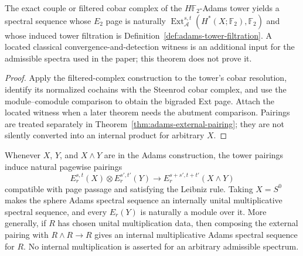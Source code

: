 \begin{theorem}
  \label{thm:adams-tower-ext-comparison}
  \notready
  The exact couple or filtered cobar complex of the
  $H\mathbb F_2$-Adams tower yields a spectral sequence whose $E_2$ page is
  naturally
  $\operatorname{Ext}_{\mathcal A}^{s,t}
  (H^*(X;\mathbb F_2),\mathbb F_2)$ and whose induced tower filtration is
  Definition~\ref{def:adams-tower-filtration}.  A located classical
  convergence-and-detection witness is an additional input for the admissible
  spectra used in the paper; this theorem does not prove it.
\end{theorem}

\begin{proof}
  Apply the filtered-complex construction to the tower's cobar resolution,
  identify its normalized cochains with the Steenrod cobar complex, and use
  the module--comodule comparison to obtain the bigraded Ext page.  Attach the
  located witness when a later theorem needs the abutment comparison.  Pairings
  are treated separately in Theorem~\ref{thm:adams-external-pairing}; they are
  not silently converted into an internal product for arbitrary $X$.
\end{proof}

\begin{theorem}
  \label{thm:adams-external-pairing}
  \notready
  Whenever $X$, $Y$, and $X\wedge Y$ are in the Adams construction, the tower
  pairings induce natural pagewise pairings
  \[
    E_r^{s,t}(X)\otimes E_r^{s',t'}(Y)
      \longrightarrow E_r^{s+s',t+t'}(X\wedge Y)
  \]
  compatible with page passage and satisfying the Leibniz rule.  Taking
  $X=S^0$ makes the sphere Adams spectral sequence an internally unital
  multiplicative spectral sequence, and every $E_r(Y)$ is naturally a module
  over it.  More generally, if $R$ has chosen unital multiplication data, then
  composing the external pairing with $R\wedge R\to R$ gives an internal
  multiplicative Adams spectral sequence for $R$.  No internal multiplication
  is asserted for an arbitrary admissible spectrum.
\end{theorem}

